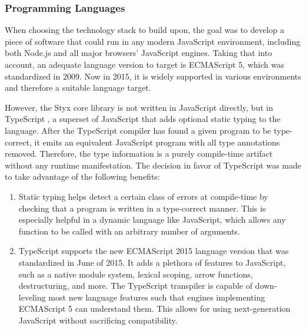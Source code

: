\subsubsection{Programming Languages}

When choosing the technology stack to build upon, the goal was to develop a piece of software that could run in any modern JavaScript environment, including both Node.js and all major browsers' JavaScript engines. Taking that into account, an adequate language version to target is ECMAScript 5, which was standardized \cite{es5-spec} in 2009. Now in 2015, it is widely supported in various environments and therefore a suitable language target.

However, the Styx core library is not written in JavaScript directly, but in TypeScript \cite{typescript}, a superset of JavaScript that adds optional static typing to the language. After the TypeScript compiler has found a given program to be type-correct, it emits an equivalent JavaScript program with all type annotations removed. Therefore, the type information is a purely compile-time artifact without any runtime manifestation. The decision in favor of TypeScript was made to take advantage of the following benefits:

\begin{enumerate}
  \item Static typing helps detect a certain class of errors at compile-time by checking that a program is written in a type-correct manner. This is especially helpful in a dynamic language like JavaScript, which allows any function to be called with an arbitrary number of arguments.
  \item TypeScript supports the new ECMAScript 2015 language version that was standardized \cite{es2015-spec} in June of 2015. It adds a plethora of features to JavaScript, such as a native module system, lexical scoping, arrow functions, destructuring, and more. The TypeScript transpiler is capable of down-leveling most new language features such that engines implementing ECMAScript 5 can understand them. This allows for using next-generation JavaScript without sacrificing compatibility.
\end{enumerate}
